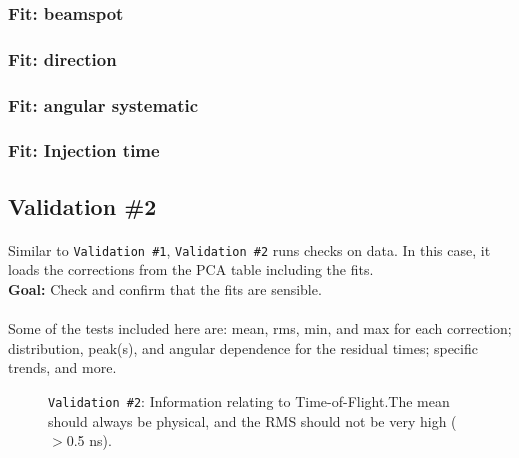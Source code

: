 \documentclass[12pt]{article}
\begin{document}
\subsubsection{Fit: beamspot}

\subsubsection{Fit: direction}

\subsubsection{Fit: angular systematic}

\subsubsection{Fit: Injection time}

\subsection{Validation \#2}\label{sec:val2}
\paragraph{}
Similar to \texttt{Validation \#1}, \texttt{Validation \#2} runs checks on data. In this case, it loads the corrections from the PCA table including the fits.\\
\textbf{Goal:} Check and confirm that the fits are sensible.

\paragraph{}
Some of the tests included here are: mean, rms, min, and max for each correction; distribution, peak(s), and angular dependence for  the residual times; specific trends, and more. 

\begin{figure}
\centering
\noindent{}
  \caption{\centering \texttt{Validation \#2}: Information relating to Time-of-Flight.\hspace{\textwidth}The mean should always be physical, and the RMS should not be very high ($>$0.5 ns).}
  \label{fig:val20}
\end{figure}
\end{document}
